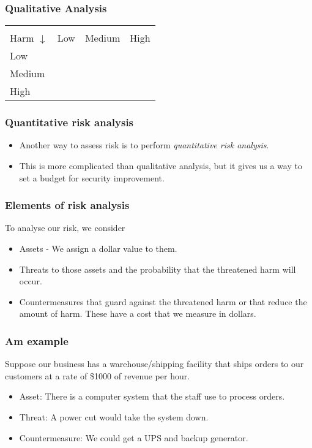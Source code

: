 \documentclass[10pt]{beamer}
\begin{document}
\begin{frame}
	\frametitle{Qualitative Analysis}

	\begin{tabularx}{\textwidth}{|X|X|X|X|}
		\hline
		\begin{tabular}{ll} Probability $\rightarrow$ \\ Harm $\downarrow$ \end{tabular} &  Low & Medium & High \\ \hline
		Low & \cellcolor{green} & \cellcolor{green} & \cellcolor{yellow} \\ \hline
		Medium & \cellcolor{green}  & \cellcolor{yellow} & \cellcolor{red} \\  \hline
		High & \cellcolor{yellow} & \cellcolor{red} & \cellcolor{red} \\ \hline
	\end{tabularx}
\end{frame}
\begin{frame}
	\frametitle{Quantitative risk analysis}

	\begin{itemize}
		\item Another way to assess risk is to perform \emph{quantitative risk analysis}.
		\item This is more complicated than qualitative analysis, but it gives us a
		      way to set a budget for security improvement.
	\end{itemize}
\end{frame}

\begin{frame}
	\frametitle{Elements of risk analysis}

	To analyse our risk, we consider

	\begin{itemize}
		\item Assets - We assign a dollar value to them.
		\item Threats to those assets and the probability that
			the threatened harm will occur.
		\item Countermeasures that guard against the threatened harm
			or that reduce the amount of harm.  These
			have a cost that we measure in dollars.
	\end{itemize}
\end{frame}

\begin{frame}
	\frametitle{Am example}
	Suppose our business has a warehouse/shipping facility
	that ships orders to our customers at a rate of 
	\$1000 of revenue per hour.

	\begin{itemize}
		\item Asset:  There is a computer system that the staff
			use to process orders.
		\item Threat:  A power cut would take the system down.
		\item Countermeasure:  We could get a UPS and backup generator.
	\end{itemize}
\end{frame}
\end{document}
